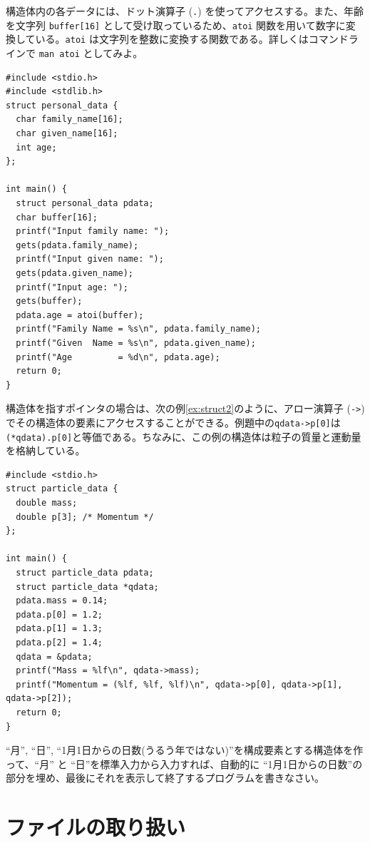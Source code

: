 構造体内の各データには、ドット演算子 (\verb|.|) を使ってアクセスする。また、年齢を文字列 \verb|buffer[16]| として受け取っているため、\verb|atoi| 関数を用いて数字に変換している。\verb|atoi| は文字列を整数に変換する関数である。詳しくはコマンドラインで \verb|man atoi| としてみよ。
\begin{reidai}\label{ex:struct1}
\begin{verbatim}
#include <stdio.h>
#include <stdlib.h>
struct personal_data {
  char family_name[16];
  char given_name[16];
  int age;
};

int main() {
  struct personal_data pdata;
  char buffer[16];
  printf("Input family name: ");
  gets(pdata.family_name);
  printf("Input given name: ");
  gets(pdata.given_name);
  printf("Input age: ");
  gets(buffer);
  pdata.age = atoi(buffer);
  printf("Family Name = %s\n", pdata.family_name);
  printf("Given  Name = %s\n", pdata.given_name);
  printf("Age         = %d\n", pdata.age);
  return 0;
}
\end{verbatim}
\end{reidai} \noindent
構造体を指すポインタの場合は、次の例\ref{ex:struct2}のように、アロー演算子 (\verb|->|) でその構造体の要素にアクセスすることができる。例題中の\verb|qdata->p[0]|は\verb|(*qdata).p[0]|と等価である。ちなみに、この例の構造体は粒子の質量と運動量を格納している。
\begin{reidai}\label{ex:struct2}
\begin{verbatim}
#include <stdio.h>
struct particle_data {
  double mass;
  double p[3]; /* Momentum */
};

int main() {
  struct particle_data pdata;
  struct particle_data *qdata;
  pdata.mass = 0.14;
  pdata.p[0] = 1.2;
  pdata.p[1] = 1.3;
  pdata.p[2] = 1.4;
  qdata = &pdata;
  printf("Mass = %lf\n", qdata->mass);
  printf("Momentum = (%lf, %lf, %lf)\n", qdata->p[0], qdata->p[1], qdata->p[2]);
  return 0;
}
\end{verbatim}
\end{reidai}
\begin{renshuu}\label{prob:7-1}
``月'', ``日'', ``1月1日からの日数(うるう年ではない)''を構成要素とする構造体を作って、``月'' と ``日''を標準入力から入力すれば、自動的に ``1月1日からの日数''の部分を埋め、最後にそれを表示して終了するプログラムを書きなさい。
\end{renshuu}

\section{ファイルの取り扱い}

